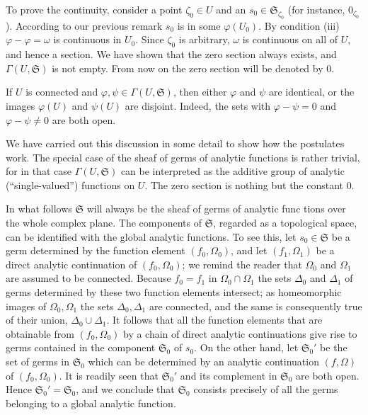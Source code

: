 To prove the continuity, consider a point $\zeta_0 \in U$ and an $s_0 \in \mathfrak{S}_{\zeta_0}$ (for instance, $0_{\zeta_0}$). According to our previous remark $s_0$ is in some $\varphi(U_0)$. By condition (iii) $\varphi - \varphi = \omega$ is continuous in $U_0$. Since $\zeta_0$ is arbitrary, $\omega$ is continuous on all of $U$, and hence a section. We have shown that the zero section always exists, and $\Gamma(U, \mathfrak{S})$ is not empty. From now on the zero section will be denoted by 0.

If $U$ is connected and $\varphi, \psi \in \Gamma(U, \mathfrak{S})$, then either $\varphi$ and $\psi$ are identical, or the images $\varphi(U)$ and $\psi(U)$ are disjoint. Indeed, the sets with $\varphi - \psi = 0$ and $\varphi - \psi \neq 0$ are both open.

We have carried out this discussion in some detail to show how the postulates work. The special case of the sheaf of germs of analytic functions is rather trivial, for in that case $\Gamma(U,\mathfrak{S})$ can be interpreted as the additive group of analytic (“single-valued”) functions on $U$. The zero section is nothing but the constant 0.

In what follows $\mathfrak{S}$ will always be the sheaf of germs of analytic func%
%
tions over the whole complex plane. The components of $\mathfrak{S}$, regarded as a topological space, can be identified with the global analytic functions. To see this, let $s_0 \in \mathfrak{S}$ be a germ determined by the function element $(f_0, \Omega_0)$, and let $(f_1, \Omega_1)$ be a direct analytic continuation of $(f_0, \Omega_0)$; we remind the reader that $\Omega_0$ and $\Omega_1$ are assumed to be connected. Because $f_0 = f_1$ in $\Omega_0 \cap \Omega_1$ the sets $\Delta_0$ and $\Delta_1$ of germs determined by these two function elements intersect; as homeomorphic images of $\Omega_0, \Omega_1$ the sets $\Delta_0, \Delta_1$ are connected, and the same is consequently true of their union, $\Delta_0 \cup \Delta_1$. It follows that all the function elements that are obtainable from $(f_0, \Omega_0)$ by a chain of direct analytic continuations give rise to germs contained in the component $\mathfrak{S}_0$ of $s_0$. On the other hand, let $\mathfrak{S}_0'$ be the set of germs in $\mathfrak{S}_0$ which can be determined by an analytic continuation $(f, \Omega)$ of $(f_0, \Omega_0)$. It is readily seen that $\mathfrak{S}_0'$ and its complement in $\mathfrak{S}_0$ are both open. Hence $\mathfrak{S}_0' = \mathfrak{S}_0$, and we conclude that $\mathfrak{S}_0$ consists precisely of all the germs belonging to a global analytic function.

